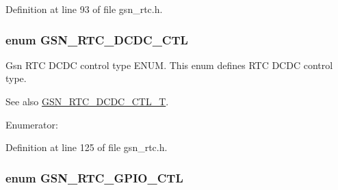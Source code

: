 Definition at line 93 of file gsn\_\-rtc.h.

\hypertarget{a00651_ga9b99af1b9b8d009d88640121a1de2e9d}{
\subsubsection[{GSN\_\-RTC\_\-DCDC\_\-CTL}]{\setlength{\rightskip}{0pt plus 5cm}enum {\bf GSN\_\-RTC\_\-DCDC\_\-CTL}}}
\label{a00651_ga9b99af1b9b8d009d88640121a1de2e9d}


Gsn RTC DCDC control type ENUM. This enum defines RTC DCDC control type. 

\begin{DoxySeeAlso}{See also}
\hyperlink{a00651_gadac67c4bef428c38b07db46ce0a24d23}{GSN\_\-RTC\_\-DCDC\_\-CTL\_\-T}. 
\end{DoxySeeAlso}
\begin{Desc}
\item[Enumerator: ]\par
\begin{description}
\item[{\em 
\hypertarget{a00651_gga9b99af1b9b8d009d88640121a1de2e9daf3e684018015ab18cce64c594a75bd62}{
GSN\_\-RTC\_\-DCDC\_\-CTL\_\-DCDC}
\label{a00651_gga9b99af1b9b8d009d88640121a1de2e9daf3e684018015ab18cce64c594a75bd62}
}]\item[{\em 
\hypertarget{a00651_gga9b99af1b9b8d009d88640121a1de2e9da0ac25212aa150f2e80f8b0d4e956d763}{
GSN\_\-RTC\_\-DCDC\_\-CTL\_\-DCDC\_\-GPIO}
\label{a00651_gga9b99af1b9b8d009d88640121a1de2e9da0ac25212aa150f2e80f8b0d4e956d763}
}]\end{description}
\end{Desc}



Definition at line 125 of file gsn\_\-rtc.h.

\hypertarget{a00651_ga3481de456997229518bb1895981bfd74}{
\subsubsection[{GSN\_\-RTC\_\-GPIO\_\-CTL}]{\setlength{\rightskip}{0pt plus 5cm}enum {\bf GSN\_\-RTC\_\-GPIO\_\-CTL}}}
\label{a00651_ga3481de456997229518bb1895981bfd74}


